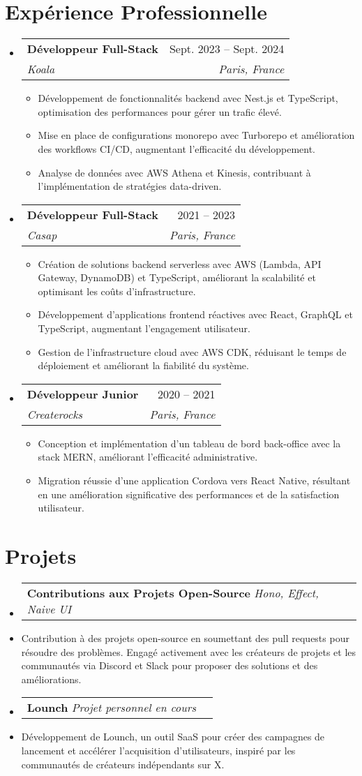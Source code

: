 \documentclass[letterpaper,11pt]{article}
\makeatletter
\newcommand{\resumeItem}[1]{
  \item\small{
    {#1 \vspace{-2pt}}
  }
}
\newcommand{\resumeSubheading}[4]{
  \vspace{-2pt}\item
    \begin{tabular*}{0.97\textwidth}[t]{l@{\extracolsep{\fill}}r}
      \textbf{#1} & #2 \\
      \textit{\small#3} & \textit{\small #4} \\
    \end{tabular*}\vspace{-7pt}
}
\newcommand{\resumeProjectHeading}[2]{
    \item
    \begin{tabular*}{0.97\textwidth}{l@{\extracolsep{\fill}}r}
      \small#1 & #2 \\
    \end{tabular*}\vspace{-7pt}
}
\newcommand{\resumeSubHeadingListStart}{\begin{itemize}[leftmargin=0.15in, label={}]}
\newcommand{\resumeSubHeadingListEnd}{\end{itemize}}
\newcommand{\resumeItemListStart}{\begin{itemize}}
\newcommand{\resumeItemListEnd}{\end{itemize}\vspace{-5pt}}
\makeatother
\begin{document}
\section{Expérience Professionnelle}
  \resumeSubHeadingListStart

    \resumeSubheading
      {Développeur Full-Stack}{Sept. 2023 -- Sept. 2024}
      {Koala}{Paris, France}
      \resumeItemListStart
        \resumeItem{Développement de fonctionnalités backend avec Nest.js et TypeScript, optimisation des performances pour gérer un trafic élevé.}
        \resumeItem{Mise en place de configurations monorepo avec Turborepo et amélioration des workflows CI/CD, augmentant l'efficacité du développement.}
        \resumeItem{Analyse de données avec AWS Athena et Kinesis, contribuant à l'implémentation de stratégies data-driven.}
      \resumeItemListEnd

    \resumeSubheading
      {Développeur Full-Stack}{2021 -- 2023}
      {Casap}{Paris, France}
      \resumeItemListStart
      \resumeItem{Création de solutions backend serverless avec AWS (Lambda, API Gateway, DynamoDB) et TypeScript, améliorant la scalabilité et optimisant les coûts d'infrastructure.}
      \resumeItem{Développement d'applications frontend réactives avec React, GraphQL et TypeScript, augmentant l'engagement utilisateur.}
      \resumeItem{Gestion de l'infrastructure cloud avec AWS CDK, réduisant le temps de déploiement et améliorant la fiabilité du système.}
    \resumeItemListEnd

    \resumeSubheading
      {Développeur Junior}{2020 -- 2021}
      {Createrocks}{Paris, France}
      \resumeItemListStart
        \resumeItem{Conception et implémentation d'un tableau de bord back-office avec la stack MERN, améliorant l'efficacité administrative.}
        \resumeItem{Migration réussie d'une application Cordova vers React Native, résultant en une amélioration significative des performances et de la satisfaction utilisateur.}
      \resumeItemListEnd

  \resumeSubHeadingListEnd

\section{Projets}
    \resumeSubHeadingListStart
      \resumeProjectHeading
          {\textbf{Contributions aux Projets Open-Source} \emph{Hono, Effect, Naive UI} }{}
          \resumeItem{Contribution à des projets open-source en soumettant des pull requests pour résoudre des problèmes. Engagé activement avec les créateurs de projets et les communautés via Discord et Slack pour proposer des solutions et des améliorations.}
      \resumeProjectHeading
          {\textbf{Lounch} \emph{Projet personnel en cours}}{}
            \resumeItem{Développement de Lounch, un outil SaaS pour créer des campagnes de lancement et accélérer l'acquisition d'utilisateurs, inspiré par les communautés de créateurs indépendants sur X.}
    \resumeSubHeadingListEnd
\end{document}
